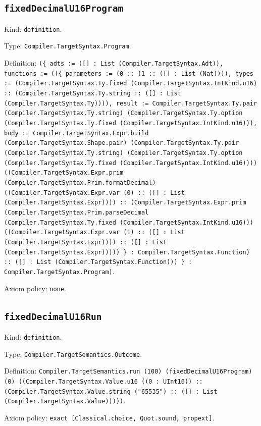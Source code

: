 \documentclass[11pt]{article}
\begin{document}
\subsection*{\texttt{fixedDecimalU16Program}}
\noindent Kind: \texttt{definition}.\par
\noindent Type: \texttt{Compiler.TargetSyntax.Program}.\par
\noindent Definition: \texttt{(\{ adts := ([] : List (Compiler.TargetSyntax.Adt)), functions := ((\{ parameters := (0 :: (1 :: ([] : List (Nat)))), types := (Compiler.TargetSyntax.Ty.fixed (Compiler.TargetSyntax.IntKind.u16) :: (Compiler.TargetSyntax.Ty.string :: ([] : List (Compiler.TargetSyntax.Ty)))), result := Compiler.TargetSyntax.Ty.pair (Compiler.TargetSyntax.Ty.string) (Compiler.TargetSyntax.Ty.option (Compiler.TargetSyntax.Ty.fixed (Compiler.TargetSyntax.IntKind.u16))), body := Compiler.TargetSyntax.Expr.build (Compiler.TargetSyntax.Shape.pair) (Compiler.TargetSyntax.Ty.pair (Compiler.TargetSyntax.Ty.string) (Compiler.TargetSyntax.Ty.option (Compiler.TargetSyntax.Ty.fixed (Compiler.TargetSyntax.IntKind.u16)))) ((Compiler.TargetSyntax.Expr.prim (Compiler.TargetSyntax.Prim.formatDecimal) ((Compiler.TargetSyntax.Expr.var (0) :: ([] : List (Compiler.TargetSyntax.Expr)))) :: (Compiler.TargetSyntax.Expr.prim (Compiler.TargetSyntax.Prim.parseDecimal (Compiler.TargetSyntax.Ty.fixed (Compiler.TargetSyntax.IntKind.u16))) ((Compiler.TargetSyntax.Expr.var (1) :: ([] : List (Compiler.TargetSyntax.Expr)))) :: ([] : List (Compiler.TargetSyntax.Expr))))) \} : Compiler.TargetSyntax.Function) :: ([] : List (Compiler.TargetSyntax.Function))) \} : Compiler.TargetSyntax.Program)}.\par
\noindent Axiom policy: \texttt{none}.\par
\subsection*{\texttt{fixedDecimalU16Run}}
\noindent Kind: \texttt{definition}.\par
\noindent Type: \texttt{Compiler.TargetSemantics.Outcome}.\par
\noindent Definition: \texttt{Compiler.TargetSemantics.run (100) (fixedDecimalU16Program) (0) ((Compiler.TargetSyntax.Value.u16 ((0 : UInt16)) :: (Compiler.TargetSyntax.Value.string ("65535") :: ([] : List (Compiler.TargetSyntax.Value)))))}.\par
\noindent Axiom policy: \texttt{exact [Classical.choice, Quot.sound, propext]}.\par
\end{document}
